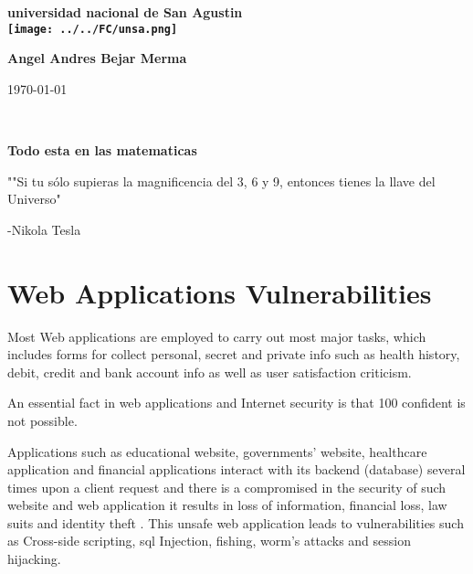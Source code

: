 \documentclass[12pt]{article}
\begin{document}
\begin{center}
\bf{\sc\Huge universidad nacional de San Agustin}\\
\vspace{20pt}
\texttt{[image: ../../FC/unsa.png]} 
\end{center}
\vspace{120pt}
\begin{center}
\bf{\sc\Huge Angel Andres Bejar Merma }\\
\end{center}
\vspace{150pt}
\begin{center}
\bf{\sc\Huge \today\par }
\end{center}
\begin{center}

\end{center}\
\newpage



\begin{center}

\bf{\sc\Huge Todo esta en las matematicas }\\
\end{center}
\begin{flushleft}
\vspace{25PT}
\large
""Si tu sólo supieras la magnificencia del 3, 6 y 9, entonces tienes la llave del Universo" 


-Nikola Tesla
\end{flushleft}
\vspace{25PT}
\section{ Web Applications Vulnerabilities }
\large

Most   Web applications are employed to
carry out most major tasks, which includes forms for collect personal, secret and private info such as health history, debit,
credit and bank account info as well as user satisfaction criticism.
 

An essential fact in web applications and Internet security
is that 100 %
confident is not possible.


Applications such as educational website, governments’
website, healthcare application and financial applications
interact with its backend (database) several times upon a
client request and there is a compromised in the security of such website and web application it results in loss of
information, financial loss, law suits and identity theft .
This  unsafe web application
leads to vulnerabilities such as Cross-side scripting, sql Injection, fishing,  worm’s attacks and session hijacking.
\end{document}
